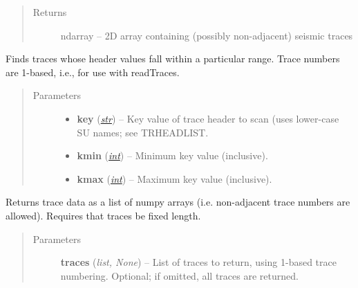 \documentclass[letterpaper,10pt,english]{sphinxmanual}
\begin{document}
\begin{fulllineitems}
\begin{fulllineitems}
\begin{quote}
\begin{description}
\item[{Returns}] \leavevmode
ndarray -- 2D array containing (possibly non-adjacent) seismic traces

\end{description}\end{quote}

\end{fulllineitems}


\begin{fulllineitems}
\label{segyread:pygeo.segyread.SEGYFile.findTraces}
Finds traces whose header values fall within a particular range.  Trace numbers are 1-based, i.e., for use with readTraces.
\begin{quote}\begin{description}
\item[{Parameters}] \leavevmode\begin{itemize}
\item {} 
\textbf{key} (\href{http://docs.python.org/library/functions.html\#str}{\emph{str}}) -- Key value of trace header to scan (uses lower-case SU names; see TRHEADLIST.

\item {} 
\textbf{kmin} (\href{http://docs.python.org/library/functions.html\#int}{\emph{int}}) -- Minimum key value (inclusive).

\item {} 
\textbf{kmax} (\href{http://docs.python.org/library/functions.html\#int}{\emph{int}}) -- Maximum key value (inclusive).

\end{itemize}

\end{description}\end{quote}

\end{fulllineitems}


\begin{fulllineitems}
\label{segyread:pygeo.segyread.SEGYFile.readTraces}
Returns trace data as a list of numpy arrays (i.e. non-adjacent trace
numbers are allowed). Requires that traces be fixed length.
\begin{quote}\begin{description}
\item[{Parameters}] \leavevmode
\textbf{traces} (\emph{list, None}) -- List of traces to return, using 1-based trace numbering.  Optional; if omitted, all traces are returned.


\end{description}
\end{quote}
\end{fulllineitems}
\end{fulllineitems}
\end{document}
